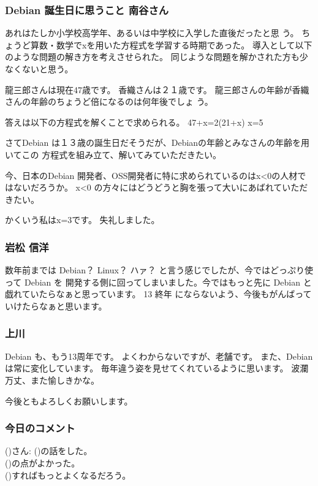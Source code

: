 \documentclass[mingoth,a4paper]{jsarticle}
\begin{document}
\subsubsection{Debian 誕生日に思うこと 南谷さん}

あれはたしか小学校高学年、あるいは中学校に入学した直後だったと思
う。
ちょうど算数・数学でxを用いた方程式を学習する時期であった。
導入として以下のような問題の解き方を考えさせられた。
同じような問題を解かされた方も少なくないと思う。

龍三郎さんは現在47歳です。
香織さんは２１歳です。
龍三郎さんの年齢が香織さんの年齢のちょうど倍になるのは何年後でしょ
う。

答えは以下の方程式を解くことで求められる。
47+x=2(21+x)
x=5

さてDebian は１３歳の誕生日だそうだが、Debianの年齢とみなさんの年齢を用いてこの
方程式を組み立て、解いてみていただきたい。

今、日本のDebian 開発者、OSS開発者に特に求められているのはx<0の人材で
はないだろうか。
x<0 の方々にはどうどうと胸を張って大いにあばれていただきたい。

かくいう私はx=3です。
失礼しました。

\subsubsection{岩松 信洋}

数年前までは Debian？ Linux？ ハァ？ と言う感じでしたが、今ではどっぷり使って Debian を
開発する側に回ってしまいました。今ではもっと先に Debian と戯れていたらなぁと思っています。
13 終年 にならないよう、今後もがんばっていけたらなぁと思います。

\subsubsection{上川}

Debian も、もう13周年です。
よくわからないですが、老舗です。
また、Debian　は常に変化しています。
毎年違う姿を見せてくれているように思います。
波瀾万丈、また愉しきかな。

今後ともよろしくお願いします。


\subsubsection{今日のコメント}

{\LARGE 
(\hspace{5cm})さん: (\hspace{5cm})の話をした。\\
(\hspace{6cm})の点がよかった。\\
(\hspace{6cm})すればもっとよくなるだろう。\\
}
\end{document}
